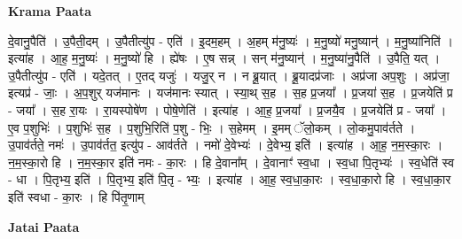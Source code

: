 \documentclass[17pt]{extarticle}
\begin{document}
\textbf{Krama Paata} \newline

दे॒वानु॒पैति॑ । उ॒पैती॒दम् । उ॒पैतीत्यु॑प - एति॑ । इ॒दम॒हम् । अ॒हम् म॑नु॒ष्यः॑ । म॒नु॒ष्यो॑ मनु॒ष्यान्॑ । म॒नु॒ष्या॑निति॑ । इत्या॑ह । आ॒ह॒ म॒नु॒ष्यः॑ । म॒नु॒ष्यो॑ हि । ह्ये॑षः । ए॒ष सन्न् । सन् म॑नु॒ष्यान्॑ । म॒नु॒ष्या॑नु॒पैति॑ । उ॒पैति॒ यत् । उ॒पैतीत्यु॑प - एति॑ । यदे॒तत् । ए॒तद् यजुः॑ । यजु॒र् न । न ब्रू॒यात् । ब्रू॒यादप्र॑जाः । अप्र॑जा अप॒शुः । अप्र॑जा॒ इत्यप्र॑ - जाः॒ । अ॒प॒शुर् यज॑मानः । यज॑मानः स्यात् । स्या॒थ् स॒ह । स॒ह प्र॒जया᳚ । प्र॒जया॑ स॒ह । प्र॒जयेति॑ प्र - जया᳚ । स॒ह रा॒यः । रा॒यस्पोषे॑ण । पोषे॒णेति॑ । इत्या॑ह । आ॒ह॒ प्र॒जया᳚ । प्र॒जयै॒व । प्र॒जयेति॑ प्र - जया᳚ । ए॒व प॒शुभिः॑ । प॒शुभिः॑ स॒ह । प॒शुभि॒रिति॑ प॒शु - भिः॒ । स॒हेमम् । इ॒मम् ॅलो॒कम् । लो॒कमु॒पाव॑र्तते । उ॒पाव॑र्तते॒ नमः॑ । उ॒पाव॑र्तत॒ इत्यु॑प - आव॑र्तते । नमो॑ दे॒वेभ्यः॑ । दे॒वेभ्य॒ इति॑ । इत्या॑ह । आ॒ह॒ न॒म॒स्का॒रः । न॒म॒स्का॒रो हि । न॒म॒स्का॒र इति॑ नमः - का॒रः । हि दे॒वाना᳚म् । दे॒वानाꣳ॑ स्व॒धा । स्व॒धा पि॒तृभ्यः॑ । स्व॒धेति॑ स्व - धा । पि॒तृभ्य॒ इति॑ । पि॒तृभ्य॒ इति॑ पि॒तृ - भ्यः॒ । इत्या॑ह । आ॒ह॒ स्व॒धा॒का॒रः । स्व॒धा॒का॒रो हि । स्व॒धा॒का॒र इति॑ स्वधा - का॒रः । हि पि॑तृ॒णाम् \newline

\textbf{Jatai Paata} \newline
\end{document}
